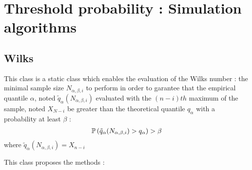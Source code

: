 \newpage
{}
\section{Threshold  probability :  Simulation algorithms}


\subsection{Wilks}

This class is a static class which enables the evaluation of the Wilks number : the minimal sample size $N_{\alpha, \beta, i}$ to perform in order to garantee that the empirical quantile $\alpha$, noted $\tilde{q}_{\alpha}(N_{\alpha, \beta, i})$ evaluated with the $(n-i)th$ maximum of the sample, noted $X_{N-i}$ be greater than the theoretical quantile $q_{\alpha}$ with a probability at least $\beta$ :
\begin{align*}
{\mathbb P}\left( \tilde{q}_{\alpha}(N_{\alpha, \beta, i}) > q_{\alpha} \right) > \beta
\end{align*}
where $\tilde{q}_{\alpha}(N_{\alpha, \beta, i}) = X_{n-i}$

This class proposes the methods :

